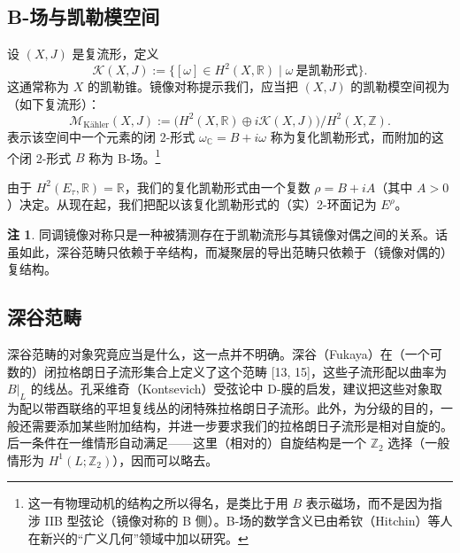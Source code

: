 \documentclass[11pt,a4paper]{article}
\theoremstyle{plain}
\theoremstyle{definition}
\newtheorem{remark}[theorem]{注}
\begin{document}
\subsection{B-场与凯勒模空间}

设 $(X,J)$ 是复流形，定义
\[
\mathcal{K}(X,J):=\bigl\{[\omega]\in H^2(X,\mathbb{R})\mid \omega\ \text{是凯勒形式}\bigr\}.
\]
这通常称为 $X$ 的凯勒锥。镜像对称提示我们，应当把 $(X,J)$ 的凯勒模空间视为（如下复流形）：
\[
\mathcal{M}_{\text{Kähler}}(X,J):=\bigl(H^2(X,\mathbb{R})\oplus i\mathcal{K}(X,J)\bigr)/H^2(X,\mathbb{Z}).
\]
表示该空间中一个元素的闭 2-形式 $\omega_{\mathbb{C}}=B+i\omega$ 称为复化凯勒形式，而附加的这个闭 2-形式 $B$ 称为 B-场。\footnote{这一有物理动机的结构之所以得名，是类比于用 $B$ 表示磁场，而不是因为指涉 IIB 型弦论（镜像对称的 B 侧）。B-场的数学含义已由希钦（Hitchin）等人在新兴的“广义几何”领域中加以研究。}

由于 $H^2(E_\tau,\mathbb{R})=\mathbb{R}$，我们的复化凯勒形式由一个复数 $\rho=B+iA$（其中 $A>0$）决定。从现在起，我们把配以该复化凯勒形式的（实）2-环面记为 $E^\rho$。
\begin{remark}
同调镜像对称只是一种被猜测存在于凯勒流形与其镜像对偶之间的关系。话虽如此，深谷范畴只依赖于辛结构，而凝聚层的导出范畴只依赖于（镜像对偶的）复结构。
\end{remark}

\subsection{深谷范畴}

深谷范畴的对象究竟应当是什么，这一点并不明确。深谷（Fukaya）在（一个可数的）闭拉格朗日子流形集合上定义了这个范畴 [13, 15]，这些子流形配以曲率为 $B|_L$ 的线丛。孔采维奇（Kontsevich）受弦论中 D-膜的启发，建议把这些对象取为配以带酉联络的平坦复线丛的闭特殊拉格朗日子流形。此外，为分级的目的，一般还需要添加某些附加结构，并进一步要求我们的拉格朗日子流形是相对自旋的。后一条件在一维情形自动满足——这里（相对的）自旋结构是一个 $\mathbb{Z}_2$ 选择（一般情形为 $H^1(L;\mathbb{Z}_2)$），因而可以略去。
\end{document}
